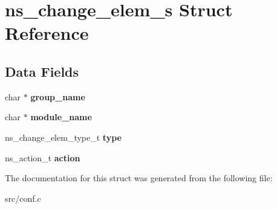 \hypertarget{structns__change__elem__s}{}\section{ns\+\_\+change\+\_\+elem\+\_\+s Struct Reference}
\label{structns__change__elem__s}
\subsection*{Data Fields}
\begin{DoxyCompactItemize}
\item 
\mbox{\label{structns__change__elem__s_a0e474b870436051341773c3bc41eb1ef}} 
char $\ast$ {\bfseries group\+\_\+name}
\item 
\mbox{\label{structns__change__elem__s_a771334425ef854aace06482fc6a8fe5f}} 
char $\ast$ {\bfseries module\+\_\+name}
\item 
\mbox{\label{structns__change__elem__s_acf370a9df10b463c6ec2c2ce6ec774e6}} 
ns\+\_\+change\+\_\+elem\+\_\+type\+\_\+t {\bfseries type}
\item 
\mbox{\label{structns__change__elem__s_a9e9d737b832b757cb0a30a43dbbfe6ce}} 
ns\+\_\+action\+\_\+t {\bfseries action}
\end{DoxyCompactItemize}


The documentation for this struct was generated from the following file\+:\begin{DoxyCompactItemize}
\item 
src/conf.\+c\end{DoxyCompactItemize}
